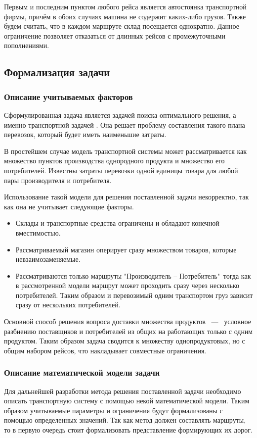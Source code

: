 	Первым и последним пунктом любого рейса является автостоянка транспортной фирмы, причём в обоих случаях машина не содержит каких-либо грузов. Также будем считать, что в каждом маршруте склад посещается однократно. Данное ограничение позволяет отказаться от длинных рейсов с промежуточными пополнениями.

\subsection{Формализация задачи}
	\subsubsection{Описание учитываемых факторов}
	Сформулированная задача является задачей поиска оптимального решения, а именно транспортной задачей \cite{trans:main}. Она решает проблему составления такого плана перевозок, который будет иметь наименьшие затраты. 
	
	В простейшем случае модель транспортной системы может рассматривается как множество пунктов производства однородного продукта и множество его потребителей. Известны затраты перевозки одной единицы товара для любой пары производителя и потребителя.
	
	Использование такой модели для решения поставленной задачи некорректно, так как она не учитывает следующие факторы.
	\begin{itemize}
		\item Склады и транспортные средства ограничены и обладают конечной вместимостью.
		\item Рассматриваемый магазин оперирует сразу множеством товаров, которые невзаимозаменяемые.
		\item Рассматриваются только маршруты "Производитель -- Потребитель"\, тогда как в рассмотренной модели маршрут может проходить сразу через несколько потребителей. Таким образом и перевозимый одним транспортом груз зависит сразу от нескольких потребителей.
	\end{itemize}
		
	Основной способ решения вопроса доставки множества продуктов \, --- \, условное разбиению поставщиков и потребителей из общих на работающих только с одним продуктом. Таким образом задача сводится к множеству однопродуктовых, но с общим набором рейсов, что накладывает совместные ограничения.
	
	\subsubsection{Описание математической модели задачи}
	Для дальнейшей разработки метода решения поставленной задачи необходимо описать транспортную систему с помощью некой математической модели. Таким образом учитываемые параметры и ограничения будут формализованы с помощью определенных значений. Так как метод должен составлять маршруты, то в первую очередь стоит формализовать представление формирующих их дорог. 
	
